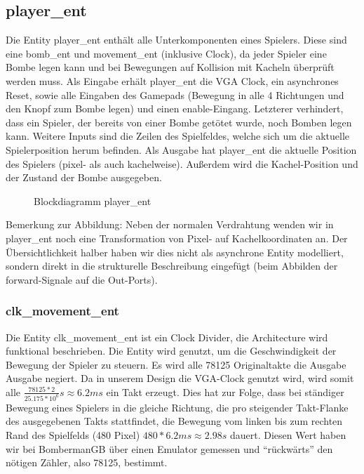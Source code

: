 \documentclass[parskip=full]{scrartcl}
\begin{document}
			\subsection{player\_ent}
				Die Entity player\_ent enthält alle Unterkomponenten eines Spielers. 
				Diese sind eine bomb\_ent und movement\_ent (inklusive Clock), da jeder Spieler eine Bombe legen kann und bei Bewegungen auf Kollision mit Kacheln überprüft werden muss.
				Als Eingabe erhält player\_ent die VGA Clock, ein asynchrones Reset, sowie alle Eingaben des Gamepads (Bewegung in alle 4 Richtungen und den Knopf zum Bombe legen) und einen enable-Eingang. Letzterer verhindert, dass ein Spieler, der bereits von einer Bombe getötet wurde, noch Bomben legen kann. Weitere Inputs sind die Zeilen des Spielfeldes, welche sich um die aktuelle Spielerposition herum befinden.
				Als Ausgabe hat player\_ent die aktuelle Position des Spielers (pixel- als auch kachelweise). Außerdem wird die Kachel-Position und der Zustand der Bombe ausgegeben.
				
				\begin{figure}[H]
					\centering
					\caption{Blockdiagramm player\_ent}
				\end{figure}
				
				Bemerkung zur Abbildung: Neben der normalen Verdrahtung wenden wir in player\_ent noch eine Transformation von Pixel- auf Kachelkoordinaten an. Der Übersichtlichkeit halber haben wir dies nicht als asynchrone Entity modelliert, sondern direkt in die strukturelle Beschreibung eingefügt (beim Abbilden der forward-Signale auf die Out-Ports).
				\subsubsection{clk\_movement\_ent}
				Die Entity clk\_movement\_ent ist ein Clock Divider, die Architecture wird funktional beschrieben. Die Entity wird genutzt, um die Geschwindigkeit der Bewegung der Spieler zu steuern. Es wird alle 78125 Originaltakte die Ausgabe Ausgabe negiert. Da in unserem Design die VGA-Clock genutzt wird, wird somit alle $\frac{78125 * 2}{25.175 * 10^6}s \approx 6.2ms$ ein Takt erzeugt. Dies hat zur Folge, dass bei ständiger Bewegung eines Spielers in die gleiche Richtung, die pro steigender Takt-Flanke des ausgegebenen Takts stattfindet, die Bewegung vom linken bis zum rechten Rand des Spielfelds (480 Pixel) $480 * 6.2 ms \approx 2.98 s$ dauert. Diesen Wert haben wir bei BombermanGB über einen Emulator gemessen und \enquote{rückwärts} den nötigen Zähler, also 78125, bestimmt.
\end{document}
